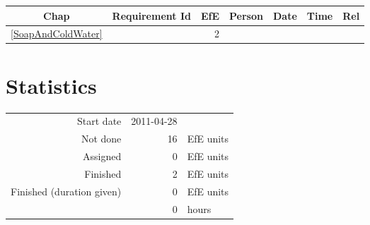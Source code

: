 {\small \begin{longtable}{|c|p{5.5cm}||r|l|l|r|r|} \hline
\textbf{Chap} & \textbf{Requirement Id} & \textbf{EfE} & \textbf{Person} & \textbf{Date} & \textbf{Time} & \textbf{Rel} \\ \hline\endhead
\ref{SoapAndColdWater} & \nameref{SoapAndColdWater} & 2 & \  &  & \  & \  \\ \hline
\end{longtable}}\section{Statistics}
\begin{longtable}{rrl}
Start date & 2011-04-28 & \\ 
Not done & 16 & EfE units \\ 
Assigned & 0 & EfE units \\ 
Finished & 2 & EfE units \\ 
Finished (duration given) & 0 & EfE units \\ 
 & 0 & hours \\ 
\end{longtable}